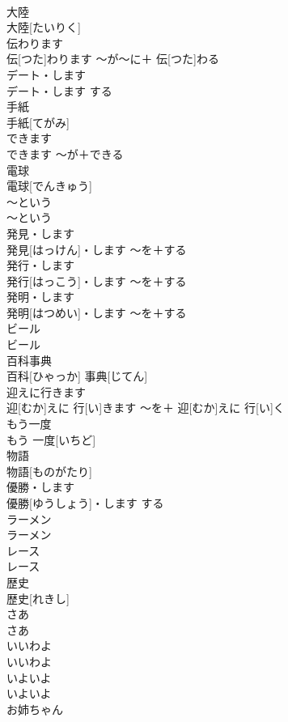 \documentclass[8pt]{extreport}
\begin{document}
\begin{CJK}{UTF8}{min}
\\	大陸	
\\	大陸[たいりく]		
\\	伝わります	
\\	伝[つた]わります	〜が〜に＋ 伝[つた]わる	
\\	デート・します	
\\	デート・します	する	
\\	手紙	
\\	手紙[てがみ]		
\\	できます	
\\	できます	〜が＋できる	
\\	電球	
\\	電球[でんきゅう]		
\\	〜という	
\\	〜という		
\\	発見・します	
\\	発見[はっけん]・します	〜を＋する	
\\	発行・します	
\\	発行[はっこう]・します	〜を＋する	
\\	発明・します	
\\	発明[はつめい]・します	〜を＋する	
\\	ビール	
\\	ビール		
\\	百科事典	
\\	百科[ひゃっか] 事典[じてん]		
\\	迎えに行きます	
\\	迎[むか]えに 行[い]きます	〜を＋ 迎[むか]えに 行[い]く	
\\	もう一度	
\\	もう 一度[いちど]		
\\	物語	
\\	物語[ものがたり]		
\\	優勝・します	
\\	優勝[ゆうしょう]・します	する	
\\	ラーメン	
\\	ラーメン		
\\	レース	
\\	レース		
\\	歴史	
\\	歴史[れきし]		
\\	さあ	
\\	さあ		
\\	いいわよ	
\\	いいわよ		
\\	いよいよ	
\\	いよいよ		
\\	お姉ちゃん	

\end{CJK}
\end{document}
